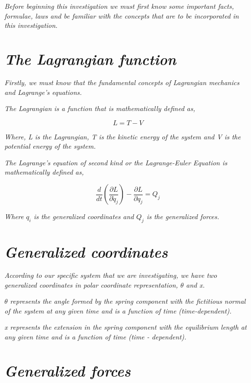 \textit{Before beginning this investigation we must first know some important facts, formulae, laws and be familiar with the concepts that are to be incorporated in this investigation.}

\section{\textit{The Lagrangian function}}
        
    \textit{Firstly, we must know that the fundamental concepts of Lagrangian mechanics and Lagrange's equations.}
        
    \textit{The Lagrangian is a function that is mathematically defined as,}
        
    $$L = T - V$$
        
    \textit{Where, L is the Lagrangian, T is the kinetic energy of the system and V is the potential energy of the system.}
        
    \textit{The Lagrange's equation of second kind or the Lagrange-Euler Equation is mathematically defined as,}
        
    $$\frac{d}{dt}\left(\frac{\partial L}{\partial \dot{q}_j}\right) - \frac{\partial L}{\partial q_j} = Q_j$$
        
    \textit{Where $q_i$ is the generalized coordinates and $Q_j$ is the generalized forces.}
      
    \section{\textit{Generalized coordinates}}
        
    \textit{According to our specific system that we are investigating, we have two generalized coordinates in polar coordinate representation, $\theta$ and x.}
        
    \textit{$\theta$ represents the angle formed by the spring component with the fictitious normal of the system at any given time and is a function of time (time-dependent).}
        
    \textit{x represents the extension in the spring component with the equilibrium length at any given time and is a function of time (time - dependent).}
            
    \section{\textit{Generalized forces}}
        
